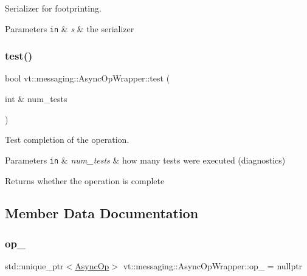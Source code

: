 Serializer for footprinting. 


\begin{DoxyParams}[1]{Parameters}
\mbox{\tt in}  & {\em s} & the serializer \\
\hline
\end{DoxyParams}
\mbox{\label{structvt_1_1messaging_1_1_async_op_wrapper_a09ca2119c78c9b3663ad6a3708d3a3c7}} 
\subsubsection{\texorpdfstring{test()}{test()}}
{\footnotesize\ttfamily bool vt\+::messaging\+::\+Async\+Op\+Wrapper\+::test (\begin{DoxyParamCaption}\item[{int \&}]{num\+\_\+tests }\end{DoxyParamCaption})\hspace{0.3cm}{\ttfamily [inline]}}



Test completion of the operation. 


\begin{DoxyParams}[1]{Parameters}
\mbox{\tt in}  & {\em num\+\_\+tests} & how many tests were executed (diagnostics)\\
\hline
\end{DoxyParams}
\begin{DoxyReturn}{Returns}
whether the operation is complete 
\end{DoxyReturn}


\subsection{Member Data Documentation}
\mbox{\label{structvt_1_1messaging_1_1_async_op_wrapper_a9b297f0a0e7852ec34b51937da04fc10}} 
\subsubsection{\texorpdfstring{op\+\_\+}{op\_}}
{\footnotesize\ttfamily std\+::unique\+\_\+ptr$<$\hyperlink{structvt_1_1messaging_1_1_async_op}{Async\+Op}$>$ vt\+::messaging\+::\+Async\+Op\+Wrapper\+::op\+\_\+ = nullptr\hspace{0.3cm}{\ttfamily [private]}}

